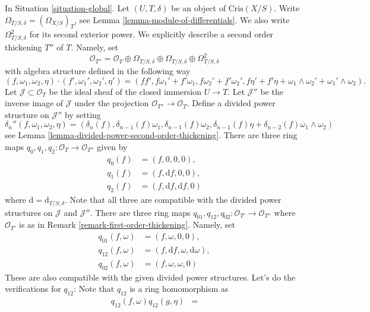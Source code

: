 \begin{remark}
\label{remark-second-order-thickening}
In Situation \ref{situation-global}.
Let $(U, T, \delta)$ be an object of $\text{Cris}(X/S)$.
Write $\Omega_{T/S, \delta} = (\Omega_{X/S})_T$, see
Lemma \ref{lemma-module-of-differentials}.
We also write $\Omega^2_{T/S, \delta}$ for its second exterior
power. We explicitly describe a second order thickening $T''$ of $T$.
Namely, set
$$
\mathcal{O}_{T''} =
\mathcal{O}_T \oplus \Omega_{T/S, \delta} \oplus \Omega_{T/S, \delta}
\oplus \Omega^2_{T/S, \delta}
$$
with algebra structure defined in the following way
$$
(f, \omega_1, \omega_2, \eta) \cdot
(f', \omega_1', \omega_2', \eta') =
(ff', f\omega_1' + f'\omega_1, f\omega_2' + f'\omega_2',
f\eta' + f'\eta + \omega_1 \wedge \omega_2' + \omega_1' \wedge \omega_2).
$$
Let $\mathcal{J} \subset \mathcal{O}_T$
be the ideal sheaf of the closed immersion $U \to T$. Let
$\mathcal{J}''$ be the inverse image of $\mathcal{J}$ under the
projection $\mathcal{O}_{T''} \to \mathcal{O}_T$.
Define a divided power structure on $\mathcal{J}''$ by setting
$$
\delta_n''(f, \omega_1, \omega_2, \eta) =
(\delta_n(f), \delta_{n - 1}(f)\omega_1, \delta_{n - 1}(f)\omega_2,
\delta_{n - 1}(f)\eta + \delta_{n - 2}(f)\omega_1 \wedge \omega_2)
$$
see Lemma \ref{lemma-divided-power-second-order-thickening}.
There are three ring maps
$q_0, q_1, q_2 : \mathcal{O}_T \to \mathcal{O}_{T''}$
given by
\begin{align*}
q_0(f) & = (f, 0, 0, 0), \\
q_1(f) & = (f, \text{d}f, 0, 0), \\
q_2(f) & = (f, \text{d}f, \text{d}f, 0)
\end{align*}
where $\text{d} = \text{d}_{T/S, \delta}$.
Note that all three are compatible with the divided power structures
on $\mathcal{J}$ and $\mathcal{J}''$. There are three ring maps
$q_{01}, q_{12}, q_{02} : \mathcal{O}_{T'} \to \mathcal{O}_{T''}$
where $\mathcal{O}_{T'}$ is as in Remark \ref{remark-first-order-thickening}.
Namely, set
\begin{align*}
q_{01}(f, \omega) & = (f, \omega, 0, 0), \\
q_{12}(f, \omega) & =
(f, \text{d}f, \omega, \text{d}\omega), \\
q_{02}(f, \omega) & = (f, \omega, \omega, 0)
\end{align*}
These are also compatible with the given divided power
structures. Let's do the verifications for $q_{12}$: Note
that $q_{12}$ is a ring homomorphism as
\begin{align*}
q_{12}(f, \omega)q_{12}(g, \eta) & =

\end{align*}
\end{remark}
